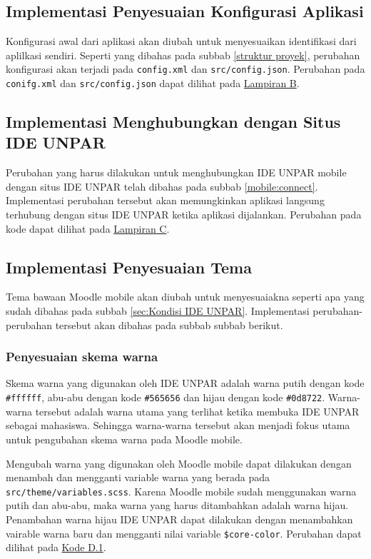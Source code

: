 \subsection{Implementasi Penyesuaian Konfigurasi Aplikasi}

Konfigurasi awal dari aplikasi akan diubah untuk menyesuaikan identifikasi dari aplilkasi sendiri. Seperti yang dibahas pada subbab \ref{struktur proyek}, perubahan konfigurasi akan terjadi pada \texttt{config.xml} dan \texttt{src/config.json}. Perubahan pada \texttt{conifg.xml} dan \texttt{src/config.json}  dapat dilihat pada \hyperref[lamp:B]{Lampiran B}.


\subsection{Implementasi Menghubungkan dengan Situs IDE UNPAR}

Perubahan yang harus dilakukan untuk menghubungkan IDE UNPAR mobile dengan situs IDE UNPAR telah dibahas pada subbab \ref{mobile:connect}.  Implementasi perubahan tersebut akan memungkinkan aplikasi langsung terhubung dengan situs IDE UNPAR ketika aplikasi dijalankan. Perubahan pada kode dapat dilihat pada  \hyperref[lamp:C]{Lampiran C}. 

\subsection{Implementasi Penyesuaian Tema}
Tema bawaan Moodle mobile akan diubah untuk menyesuaiakna seperti apa yang sudah dibahas pada subbab \ref{sec:Kondisi IDE UNPAR}. Implementasi perubahan-perubahan tersebut akan dibahas pada subbab subbab berikut.

\subsubsection{Penyesuaian skema warna}
Skema warna yang digunakan oleh IDE UNPAR adalah warna putih dengan kode \texttt{\#ffffff}, abu-abu dengan kode \texttt{\#565656} dan hijau dengan kode \texttt{\#0d8722}.  Warna-warna tersebut adalah warna utama yang terlihat ketika membuka IDE UNPAR sebagai mahasiswa. Sehingga warna-warna tersebut akan menjadi fokus utama untuk pengubahan skema warna pada Moodle mobile.

Mengubah warna yang digunakan oleh Moodle mobile dapat dilakukan dengan menambah dan mengganti variable warna yang berada pada \texttt{src/theme/variables.scss}. Karena Moodle mobile sudah menggunakan warna putih dan abu-abu, maka warna yang harus ditambahkan adalah warna hijau. Penambahan warna hijau IDE UNPAR dapat dilakukan dengan menambahkan vairable warna baru dan mengganti nilai variable \texttt{\$core-color}. Perubahan dapat dilihat pada \hyperref[variable-scss]{Kode D.1}.

